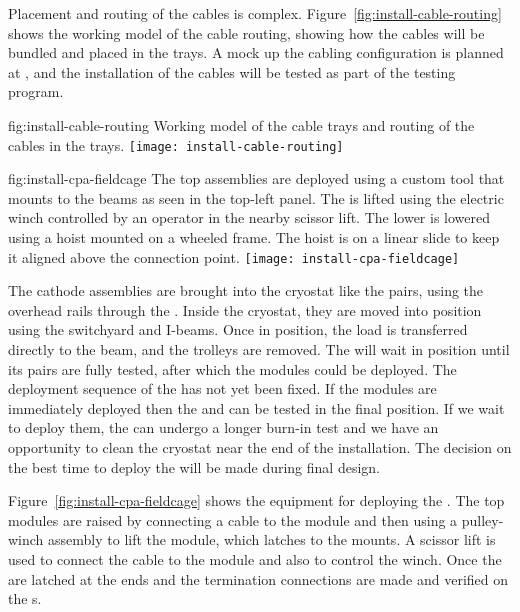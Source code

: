Placement and routing of the cables is complex. 
Figure~\ref{fig:install-cable-routing} shows the working \threed model of the cable routing, showing how the cables will be bundled and placed in the trays. 
A mock up the cabling configuration is planned at , and the installation of the cables will be tested as part of the  testing program.

\begin{dunefigure}{fig:install-cable-routing}
  {Working model of the cable trays and routing of the  cables in the trays.}
\texttt{[image: install-cable-routing]}
\end{dunefigure}


\begin{dunefigure}{fig:install-cpa-fieldcage}
  {The top  assemblies are deployed using a custom tool that mounts to the  beams as seen in the top-left panel. The   is lifted using the electric winch controlled by an operator in the nearby scissor lift. The lower   is lowered using a hoist mounted on a wheeled frame. The hoist is on a linear slide to keep it aligned above the connection point.}
\texttt{[image: install-cpa-fieldcage]}
\end{dunefigure}

The cathode  assemblies are brought into the cryostat like the  pairs, using the overhead rails through the . 
Inside the cryostat, they are moved into position using the  switchyard and  I-beams. 
Once in position, the load is transferred directly to the  beam, and the trolleys are removed. 
The  will wait in position until its  pairs are fully tested, after which the  modules could be deployed. 
The deployment sequence of the  has not yet been fixed. 
If the  modules are immediately deployed then the  and  can be tested in the final position. 
If we wait to deploy them, the  can undergo a longer burn-in test and we have an  opportunity to clean the cryostat near the end of the installation. 
The decision on the best time to deploy the  will be made during final design.

Figure~\ref{fig:install-cpa-fieldcage} shows the equipment for deploying the . 
The top  modules are raised by connecting a cable to the module and then using a pulley-winch assembly to lift the module, which latches to the  mounts. 
A scissor lift is used to connect the cable to the module and also to control the winch. 
Once the  are latched at the  ends and the  termination connections are made and verified on the s.

